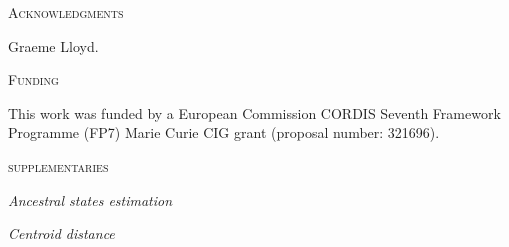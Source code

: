 \documentclass[12pt,letterpaper]{article}
\renewcommand{\section}[1]{%
\bigskip
\begin{center}
\begin{Large}
\normalfont\scshape #1
\medskip
\end{Large}
\end{center}}
\renewcommand{\subsection}[1]{%
\bigskip
\begin{center}
\begin{large}
\normalfont\itshape #1
\end{large}
\end{center}}
\begin{document}
\section{Acknowledgments}
Graeme Lloyd. 

\section{Funding}
This work was funded by a European Commission CORDIS Seventh Framework Programme (FP7) Marie Curie CIG grant (proposal number: 321696).




\section{supplementaries}

\subsection{Ancestral states estimation}
\subsection{Centroid distance}
\end{document}
